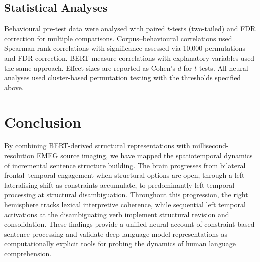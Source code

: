 \documentclass[11pt]{article}
\begin{document}
\subsection{Statistical Analyses}
Behavioural pre-test data were analysed with paired $t$-tests (two-tailed) and FDR correction for multiple comparisons. Corpus--behavioural correlations used Spearman rank correlations with significance assessed via 10,000 permutations and FDR correction. BERT measure correlations with explanatory variables used the same approach. Effect sizes are reported as Cohen's $d$ for $t$-tests. All neural analyses used cluster-based permutation testing with the thresholds specified above.

\section{Conclusion}

By combining BERT-derived structural representations with millisecond-resolution EMEG source imaging, we have mapped the spatiotemporal dynamics of incremental sentence structure building. The brain progresses from bilateral frontal--temporal engagement when structural options are open, through a left-lateralising shift as constraints accumulate, to predominantly left temporal processing at structural disambiguation. Throughout this progression, the right hemisphere tracks lexical interpretive coherence, while sequential left temporal activations at the disambiguating verb implement structural revision and consolidation. These findings provide a unified neural account of constraint-based sentence processing and validate deep language model representations as computationally explicit tools for probing the dynamics of human language comprehension.



\end{document}

